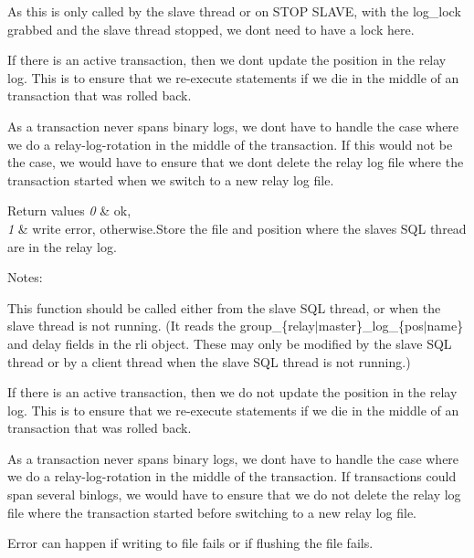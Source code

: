 \begin{DoxyItemize}
\item As this is only called by the slave thread or on S\+T\+OP S\+L\+A\+VE, with the log\+\_\+lock grabbed and the slave thread stopped, we don\textquotesingle{}t need to have a lock here.
\item If there is an active transaction, then we don\textquotesingle{}t update the position in the relay log. This is to ensure that we re-\/execute statements if we die in the middle of an transaction that was rolled back.
\item As a transaction never spans binary logs, we don\textquotesingle{}t have to handle the case where we do a relay-\/log-\/rotation in the middle of the transaction. If this would not be the case, we would have to ensure that we don\textquotesingle{}t delete the relay log file where the transaction started when we switch to a new relay log file.
\end{DoxyItemize}


\begin{DoxyRetVals}{Return values}
{\em 0} & ok, \\
\hline
{\em 1} & write error, otherwise.\+Store the file and position where the slave\textquotesingle{}s S\+QL thread are in the relay log.\\
\hline
\end{DoxyRetVals}
Notes\+:


\begin{DoxyItemize}
\item This function should be called either from the slave S\+QL thread, or when the slave thread is not running. (It reads the group\+\_\+\{relay$\vert$master\}\+\_\+log\+\_\+\{pos$\vert$name\} and delay fields in the rli object. These may only be modified by the slave S\+QL thread or by a client thread when the slave S\+QL thread is not running.)
\item If there is an active transaction, then we do not update the position in the relay log. This is to ensure that we re-\/execute statements if we die in the middle of an transaction that was rolled back.
\item As a transaction never spans binary logs, we don\textquotesingle{}t have to handle the case where we do a relay-\/log-\/rotation in the middle of the transaction. If transactions could span several binlogs, we would have to ensure that we do not delete the relay log file where the transaction started before switching to a new relay log file.
\item Error can happen if writing to file fails or if flushing the file fails.
\end{DoxyItemize}


